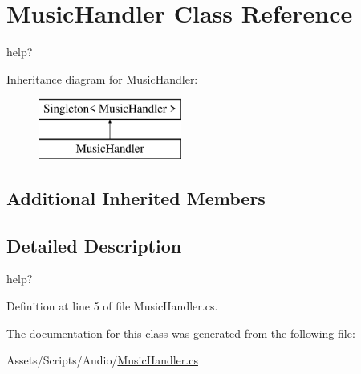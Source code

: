 \hypertarget{class_music_handler}{}\section{Music\+Handler Class Reference}
\label{class_music_handler}


help?  


Inheritance diagram for Music\+Handler\+:\begin{figure}[H]
\begin{center}
\leavevmode
\includegraphics[height=2.000000cm]{class_music_handler}
\end{center}
\end{figure}
\subsection*{Additional Inherited Members}


\subsection{Detailed Description}
help? 



Definition at line 5 of file Music\+Handler.\+cs.



The documentation for this class was generated from the following file\+:\begin{DoxyCompactItemize}
\item 
Assets/\+Scripts/\+Audio/\mbox{\hyperlink{_music_handler_8cs}{Music\+Handler.\+cs}}\end{DoxyCompactItemize}
